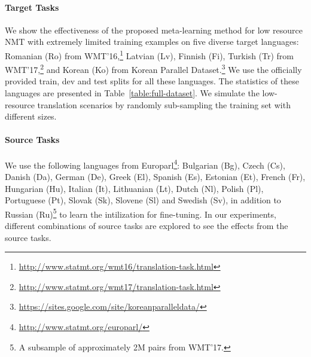 \paragraph{Target Tasks}
We show the effectiveness of the proposed meta-learning method for low resource NMT with extremely limited training examples on five diverse target languages: Romanian (Ro) from WMT'16,\footnote{
\url{http://www.statmt.org/wmt16/translation-task.html}
}
Latvian (Lv), Finnish (Fi), Turkish (Tr) from WMT'17,\footnote{
\url{http://www.statmt.org/wmt17/translation-task.html}
}
and Korean (Ko) from Korean Parallel Dataset.\footnote{
\url{https://sites.google.com/site/koreanparalleldata/}
}
We use the officially provided train, dev and test splits for all these languages. %
The statistics of these languages are presented in Table~\ref{table:full-dataset}. We simulate the low-resource translation scenarios by randomly sub-sampling the training set with different sizes.


\paragraph{Source Tasks}

We use the following languages from Europarl\footnote{
\url{http://www.statmt.org/europarl/}
}:
Bulgarian (Bg),
Czech (Cs), 
Danish (Da),
German (De),
Greek  (El),
Spanish (Es),
Estonian  (Et),
French (Fr),
Hungarian   (Hu),
Italian (It),
Lithuanian  (Lt),
Dutch   (Nl),
Polish  (Pl),
Portuguese  (Pt),
Slovak  (Sk),
Slovene (Sl) and
Swedish (Sv), in addition to Russian (Ru)\footnote{
A subsample of approximately 2M pairs from WMT'17.
} to learn the intilization for fine-tuning. In our experiments, different combinations of source tasks are explored to see the effects from the source tasks.




